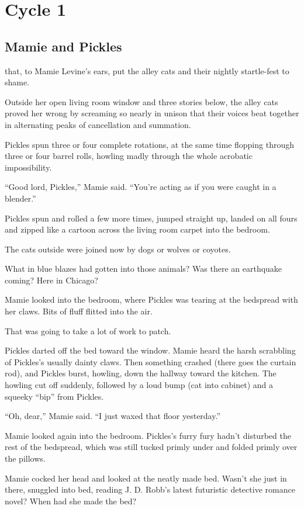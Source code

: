 \part{Cycle 1}

\chapter{Mamie and Pickles}

 that, to Mamie Levine’s ears, put the alley cats and their nightly startle-fest to shame.

Outside her open living room window and three stories below, the alley cats proved her wrong by screaming so nearly in unison that their voices beat together in alternating peaks of cancellation and summation.

Pickles spun three or four complete rotations, at the same time flopping through three or four barrel rolls, howling madly through the whole acrobatic impossibility.

“Good lord, Pickles,” Mamie said. “You’re acting as if you were caught in a blender.”

Pickles spun and rolled a few more times, jumped straight up, landed on all fours and zipped like a cartoon across the living room carpet into the bedroom.

The cats outside were joined now by dogs or wolves or coyotes.

What in blue blazes had gotten into those animals? Was there an earthquake coming? Here in Chicago?

Mamie looked into the bedroom, where Pickles was tearing at the bedspread with her claws. Bits of fluff flitted into the air.

That was going to take a lot of work to patch.

Pickles darted off the bed toward the window. Mamie heard the harsh scrabbling of Pickles’s usually dainty claws. Then something crashed (there goes the curtain rod), and Pickles burst, howling, down the hallway toward the kitchen. The howling cut off suddenly, followed by a loud bump (cat into cabinet) and a squeeky “bip” from Pickles.

“Oh, dear,” Mamie said. “I just waxed that floor yesterday.”

Mamie looked again into the bedroom. Pickles’s furry fury hadn’t disturbed the rest of the bedspread, which was still tucked primly under and folded primly over the pillows.

Mamie cocked her head and looked at the neatly made bed. Wasn’t she just in there, snuggled into bed, reading J. D. Robb’s latest futuristic detective romance novel? When had she made the bed?

